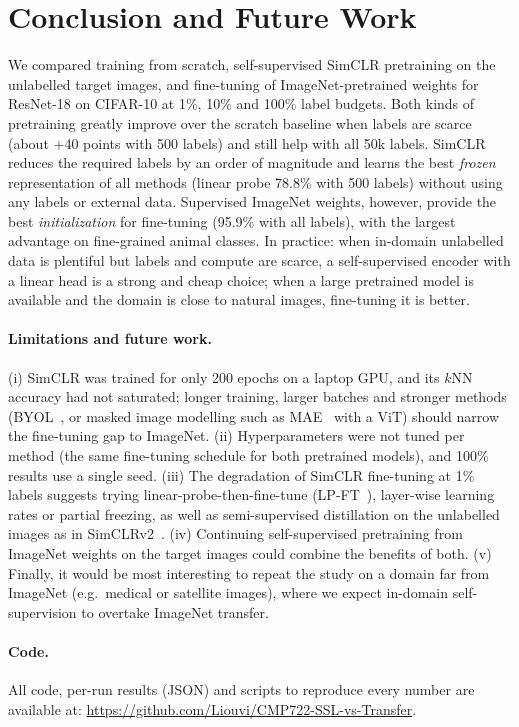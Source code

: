 \documentclass[10pt,a4paper]{article}
\begin{document}
\section{Conclusion and Future Work}
We compared training from scratch, self-supervised SimCLR pretraining on the unlabelled target
images, and fine-tuning of ImageNet-pretrained weights for ResNet-18 on CIFAR-10 at 1\%, 10\% and
100\% label budgets. Both kinds of pretraining greatly improve over the scratch baseline when
labels are scarce (about +40 points with 500 labels) and still help with all 50k labels. SimCLR
reduces the required labels by an order of magnitude and learns the best \emph{frozen}
representation of all methods (linear probe 78.8\% with 500 labels) without using any labels or
external data. Supervised ImageNet weights, however, provide the best \emph{initialization} for
fine-tuning (95.9\% with all labels), with the largest advantage on fine-grained animal classes.
In practice: when in-domain unlabelled data is plentiful but labels and compute are scarce, a
self-supervised encoder with a linear head is a strong and cheap choice; when a large pretrained
model is available and the domain is close to natural images, fine-tuning it is better.

\paragraph{Limitations and future work.} (i) SimCLR was trained for only 200 epochs on a laptop
GPU, and its $k$NN accuracy had not saturated; longer training, larger batches and stronger
methods (BYOL~\cite{byol}, or masked image modelling such as MAE~\cite{mae} with a ViT) should
narrow the fine-tuning gap to ImageNet. (ii) Hyperparameters were not tuned per method (the same
fine-tuning schedule for both pretrained models), and 100\% results use a single seed.
(iii) The degradation of SimCLR fine-tuning at 1\% labels suggests trying linear-probe-then-fine-tune
(LP-FT~\cite{lpft}), layer-wise learning rates or partial freezing, as well as semi-supervised
distillation on the unlabelled images as in SimCLRv2~\cite{simclrv2}. (iv) Continuing
self-supervised pretraining from ImageNet weights on the target images could combine the benefits
of both. (v) Finally, it would be most interesting to repeat the study on a domain far from
ImageNet (e.g.\ medical or satellite images), where we expect in-domain self-supervision to
overtake ImageNet transfer.

\paragraph{Code.} All code, per-run results (JSON) and scripts to reproduce every number are
available at: \url{https://github.com/Liouvi/CMP722-SSL-vs-Transfer}.
\end{document}
